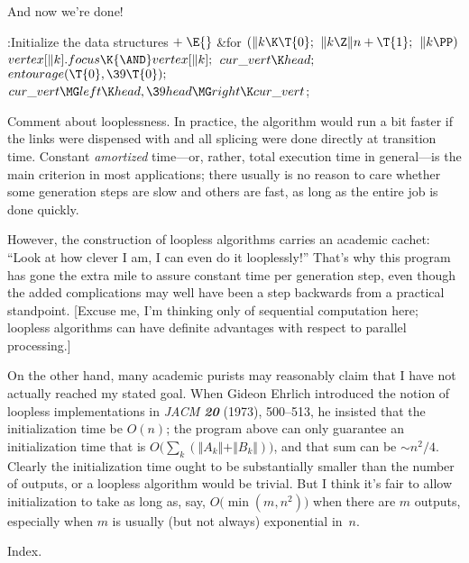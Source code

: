 And now we're done!

\Y\B\4:Initialize the data structures\X${}\mathrel+\E{}$\6
\&{for} ${}(\|k\K\T{0};{}$ ${}\|k\Z\|n+\T{1};{}$ ${}\|k\PP){}$\1\5
${}\\{vertex}[\|k].\\{focus}\K{\AND}\\{vertex}[\|k];{}$\2\6
${}\\{cur\_vert}\K\\{head};{}$\6
${}\\{entourage}(\T{0},\39\T{0});{}$\6
${}\\{cur\_vert}\MG\\{left}\K\\{head},\39\\{head}\MG\\{right}\K\\{cur%
\_vert}{}$;\par
\fi

Comment about looplessness. In practice, the
algorithm
would run a bit faster if the  links were dispensed with
and all splicing were done directly at transition time. Constant
{\it amortized\/} time---or, rather, total execution time in general---is the
main criterion in most applications; there usually is no
reason to care whether some generation steps are slow and others are
fast, as long as the entire job is done quickly.

However, the construction of loopless algorithms carries an academic cachet:
``Look at how clever I am, I can even do it looplessly!''
That's why this program has gone the
extra mile to assure constant time per generation step, even though the
added complications
may well have been a step backwards from a practical standpoint.
[Excuse me, I'm thinking only of sequential computation here; loopless
algorithms can have definite advantages with respect to parallel processing.]

On the other hand, many academic purists may reasonably claim that I have not
actually reached my stated goal.
When Gideon Ehrlich introduced the notion of loopless implementations
in {\sl JACM\/ \bf20} (1973), 500--513, he insisted that the
initialization time be $O(n)$; the program above can only
guarantee an initialization time that is $O\bigl(\sum_k(\Vert A_k\Vert+
\Vert B_k\Vert)\bigr)$, and that sum can be $\sim n^2\!/4$.
Clearly the initialization time
ought to be substantially smaller than the number of outputs,
or a loopless algorithm would be trivial.
But I think it's fair to allow initialization to take as long
as, say, $O\bigl(\min(m,n^2)\bigr)$ when there are $m$ outputs,
especially when $m$ is usually (but not always) exponential in~$n$.

\fi

Index.
\fi

\inx
\fin
\con
